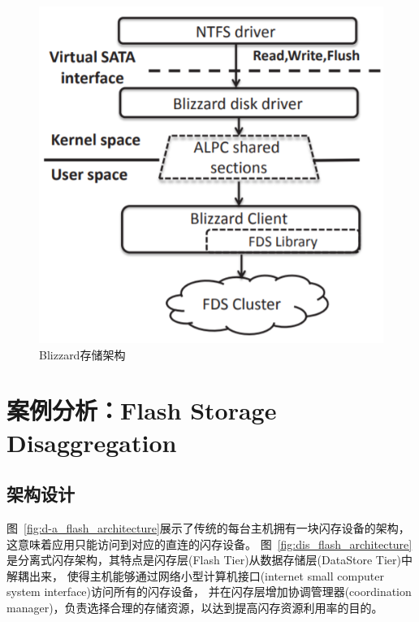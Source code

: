 \begin{figure}
\centering
\includegraphics[scale=0.8]{Figures/storage/blizzard.jpg}
\decoRule
\caption{Blizzard存储架构}
\label{fig:blizzard}
\end{figure}

\section{案例分析：Flash Storage Disaggregation}

\subsection{架构设计}

图~\ref{fig:d-a_flash_architecture}展示了传统的每台主机拥有一块闪存设备的架构，这意味着应用只能访问到对应的直连的闪存设备。
图~\ref{fig:dis_flash_architecture}是分离式闪存架构，其特点是闪存层(Flash Tier)从数据存储层(DataStore Tier)中解耦出来，
使得主机能够通过网络小型计算机接口(internet small computer system interface)访问所有的闪存设备，
并在闪存层增加协调管理器(coordination manager)，负责选择合理的存储资源，以达到提高闪存资源利用率的目的。

